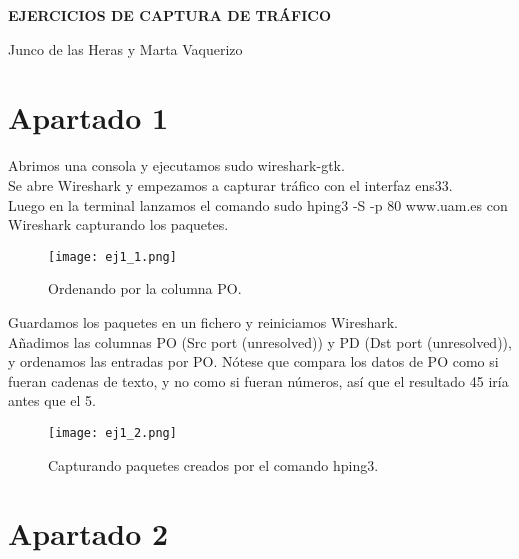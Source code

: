 \documentclass[12pt]{article}
\begin{document}
\iffalse
\title{Ejercicios de captura de tráfico}
\author{Junco de las Heras , Marta Vaquerizo}

\maketitle
\medskip
\fi

\begin{titlepage}
    \begin{center}
        \vspace*{1cm}
 
        \Huge
        \textbf{\textbf{EJERCICIOS DE CAPTURA DE TRÁFICO}}
 
        \vspace{1 cm}
        \LARGE
        Junco de las Heras y  Marta Vaquerizo
    \end{center}
\end{titlepage}
\newpage

\tableofcontents
\newpage

\section{Apartado 1}
Abrimos una consola y ejecutamos sudo wireshark-gtk.\\
Se abre Wireshark y empezamos a capturar tráfico con el interfaz ens33.\\
Luego en la terminal lanzamos el comando sudo hping3 -S -p 80 www.uam.es con Wireshark capturando los paquetes.

\begin{figure}[h!]
    \centering
    \texttt{[image: ej1\_1.png]}
    \caption{Ordenando por la columna PO.}
\end{figure}

Guardamos los paquetes en un fichero y reiniciamos Wireshark.\\ Añadimos las columnas PO (Src port (unresolved)) y PD (Dst port (unresolved)), y ordenamos las entradas por PO. Nótese que compara los datos de PO como si fueran cadenas de texto, y no como si fueran números, así que el resultado 45 iría antes que el 5.

\begin{figure}[h!]
    \centering
    \texttt{[image: ej1\_2.png]}
    \caption{Capturando paquetes creados por el comando hping3.}
\end{figure}


\section{Apartado 2}
\end{document}
